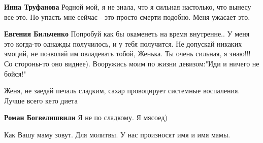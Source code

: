 \begin{itemize}
\begin{itemize}
 
\textbf{Инна Труфанова} Родной мой, я не знала, что я сильная настолько, что вынесу все это. Но упасть мне сейчас - это просто смерти подобно. Меня ужасает это.

 
\textbf{Евгения Бильченко} Попробуй как бы окаменеть на время внутренне.. У меня это когда-то однажды получилось, и у тебя получится. Не допускай никаких эмоций, не позволяй им овладевать тобой, Женька. Ты очень сильная, я знаю!!! Со стороны-то оно виднее). Вооружись моим по жизни девизом:"Иди и ничего не бойся!"
\end{itemize}

 
Женя, не заедай печаль сладким, сахар провоцирует системные воспаления. Лучше всего кето диета

\begin{itemize}
 
\textbf{Роман Богвелишвили} Я не по сладкому. Я мясоед)
\end{itemize}

 
Как Вашу маму зовут. Для молитвы. У нас произносят имя и имя мамы.


\end{itemize}
